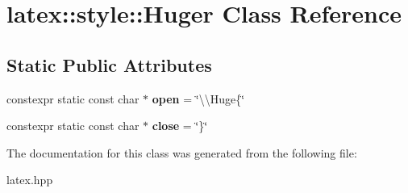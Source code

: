 \hypertarget{classlatex_1_1style_1_1Huger}{\section{latex\-:\-:style\-:\-:Huger Class Reference}
\label{classlatex_1_1style_1_1Huger}
}
\subsection*{Static Public Attributes}
\begin{DoxyCompactItemize}
\item 
\hypertarget{classlatex_1_1style_1_1Huger_a87ec955bda49bd2d90115e03dc4b99d2}{constexpr static const char $\ast$ {\bfseries open} = \char`\"{}\textbackslash{}\textbackslash{}Huge\{\char`\"{}}\label{classlatex_1_1style_1_1Huger_a87ec955bda49bd2d90115e03dc4b99d2}

\item 
\hypertarget{classlatex_1_1style_1_1Huger_a24d1bf39b9473b2b30e6cb8c2929637b}{constexpr static const char $\ast$ {\bfseries close} = \char`\"{}\}\char`\"{}}\label{classlatex_1_1style_1_1Huger_a24d1bf39b9473b2b30e6cb8c2929637b}

\end{DoxyCompactItemize}


The documentation for this class was generated from the following file\-:\begin{DoxyCompactItemize}
\item 
latex.\-hpp\end{DoxyCompactItemize}
